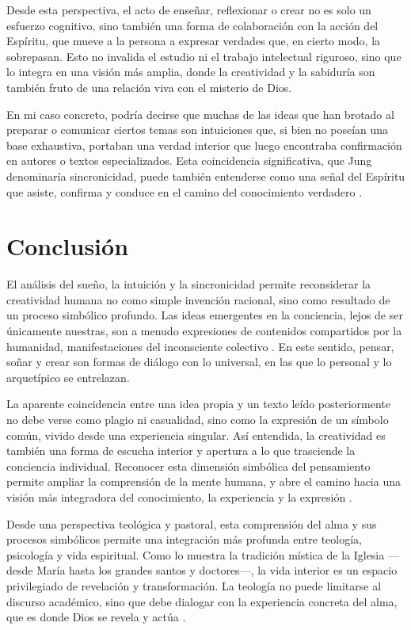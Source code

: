 Desde esta perspectiva, el acto de enseñar, reflexionar o crear no es solo un esfuerzo cognitivo, sino también una forma de colaboración con la acción del Espíritu, que mueve a la persona a expresar verdades que, en cierto modo, la sobrepasan. Esto no invalida el estudio ni el trabajo intelectual riguroso, sino que lo integra en una visión más amplia, donde la creatividad y la sabiduría son también fruto de una relación viva con el misterio de Dios.

En mi caso concreto, podría decirse que muchas de las ideas que han brotado al preparar o comunicar ciertos temas son intuiciones que, si bien no poseían una base exhaustiva, portaban una verdad interior que luego encontraba confirmación en autores o textos especializados. Esta coincidencia significativa, que Jung denominaría sincronicidad, puede también entenderse como una señal del Espíritu que asiste, confirma y conduce en el camino del conocimiento verdadero \cite{jung1959}.

\section*{Conclusión}

El análisis del sueño, la intuición y la sincronicidad permite reconsiderar la creatividad humana no como simple invención racional, sino como resultado de un proceso simbólico profundo. Las ideas emergentes en la conciencia, lejos de ser únicamente nuestras, son a menudo expresiones de contenidos compartidos por la humanidad, manifestaciones del inconsciente colectivo \cite{jung1959}. En este sentido, pensar, soñar y crear son formas de diálogo con lo universal, en las que lo personal y lo arquetípico se entrelazan.

La aparente coincidencia entre una idea propia y un texto leído posteriormente no debe verse como plagio ni casualidad, sino como la expresión de un símbolo común, vivido desde una experiencia singular. Así entendida, la creatividad es también una forma de escucha interior y apertura a lo que trasciende la conciencia individual. Reconocer esta dimensión simbólica del pensamiento permite ampliar la comprensión de la mente humana, y abre el camino hacia una visión más integradora del conocimiento, la experiencia y la expresión \cite{jung1959}.

Desde una perspectiva teológica y pastoral, esta comprensión del alma y sus procesos simbólicos permite una integración más profunda entre teología, psicología y vida espiritual. Como lo muestra la tradición mística de la Iglesia —desde María hasta los grandes santos y doctores—, la vida interior es un espacio privilegiado de revelación y transformación. La teología no puede limitarse al discurso académico, sino que debe dialogar con la experiencia concreta del alma, que es donde Dios se revela y actúa \cite{jung1959}.

